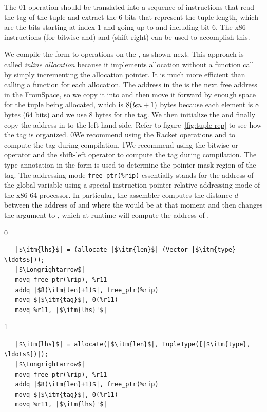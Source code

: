 \documentclass[7x10]{TimesAPriori_MIT}%
\def\racketEd{0}
\def\pythonEd{1}
\def\edition{1}
\newcommand{\racket}[1]{{\if\edition\racketEd{#1}\fi}}
\newcommand{\pythonColor}[0]{}
\newcommand{\python}[1]{{\if\edition\pythonEd\pythonColor #1\fi}}
\numberwithin{theorem}{chapter}
\numberwithin{definition}{chapter}
\numberwithin{equation}{chapter}
\begin{document}
The \racket{}\python{} operation should
be translated into a sequence of instructions that read the tag of the
tuple and extract the 6 bits that represent the tuple length, which
are the bits starting at index 1 and going up to and including bit 6.
The x86 instructions  (for bitwise-and) and 
(shift right) can be used to accomplish this.

We compile the  form to operations on the
, as shown next.  This approach is called
\emph{inline allocation} because it implements allocation without a
function call by simply incrementing the allocation pointer. It is much
more efficient than calling a function for each allocation. The
address in the  is the next free address in the
FromSpace, so we copy it into  and then move it forward by
enough space for the tuple being allocated, which is $8(\mathit{len}+1)$
bytes because each element is 8 bytes (64 bits) and we use 8 bytes for
the tag.  We then initialize the  and finally copy the
address in  to the left-hand side. Refer to
figure~\ref{fig:tuple-rep} to see how the tag is organized.
%
\racket{We recommend using the Racket operations
\code{bitwise-ior} and \code{arithmetic-shift} to compute the tag
during compilation.}
%
\python{We recommend using the bitwise-or operator \code{|} and the
  shift-left operator \code{<<} to compute the tag during
  compilation.}
%
The type annotation in the  form is used to determine
the pointer mask region of the tag.
%
The addressing mode \verb!free_ptr(%rip)! essentially stands for the
address of the  global variable using a special
instruction-pointer-relative addressing mode of the x86-64 processor.
In particular, the assembler computes the distance $d$ between the
address of  and where the  would be at that
moment and then changes the  argument to
, which at runtime will compute the address of
.
%
{\if\edition\racketEd
\begin{lstlisting}
   |$\itm{lhs}$| = (allocate |$\itm{len}$| (Vector |$\itm{type} \ldots$|));
   |$\Longrightarrow$|
   movq free_ptr(%rip), %r11
   addq |$8(\itm{len}+1)$|, free_ptr(%rip)
   movq $|$\itm{tag}$|, 0(%r11)
   movq %r11, |$\itm{lhs}'$|
\end{lstlisting}
\fi}
{\if\edition\pythonEd\pythonColor    
\begin{lstlisting}
   |$\itm{lhs}$| = allocate(|$\itm{len}$|, TupleType([|$\itm{type}, \ldots$])|);
   |$\Longrightarrow$|
   movq free_ptr(%rip), %r11
   addq |$8(\itm{len}+1)$|, free_ptr(%rip)
   movq $|$\itm{tag}$|, 0(%r11)
   movq %r11, |$\itm{lhs}'$|
\end{lstlisting}
\fi}
\end{document}
